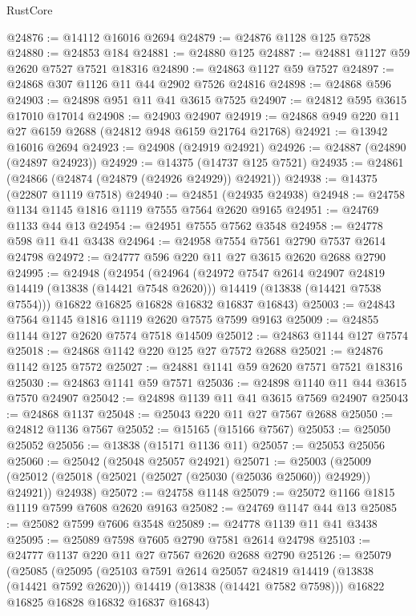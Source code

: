 \begin{lexlean}{RustCore}
\begin{coremodule}
@24876 := @14112 @16016 @2694
@24879 := @24876 @1128 @125 @7528
@24880 := @24853 @184
@24881 := @24880 @125
@24887 := @24881 @1127 @59 @2620 @7527 @7521 @18316
@24890 := @24863 @1127 @59 @7527
@24897 := @24868 @307 @1126 @11 @44 @2902 @7526 @24816
@24898 := @24868 @596
@24903 := @24898 @951 @11 @41 @3615 @7525
@24907 := @24812 @595 @3615 @17010 @17014
@24908 := @24903 @24907
@24919 := @24868 @949 @220 @11 @27 @6159 @2688 (@24812 @948 @6159 @21764 @21768)
@24921 := @13942 @16016 @2694
@24923 := @24908 (@24919 @24921)
@24926 := @24887 (@24890 (@24897 @24923))
@24929 := @14375 (@14737 @125 @7521)
@24935 := @24861 (@24866 (@24874 (@24879 (@24926 @24929)) @24921))
@24938 := @14375 (@22807 @1119 @7518)
@24940 := @24851 (@24935 @24938)
@24948 := @24758 @1134 @1145 @1816 @1119 @7555 @7564 @2620 @9165
@24951 := @24769 @1133 @44 @13
@24954 := @24951 @7555 @7562 @3548
@24958 := @24778 @598 @11 @41 @3438
@24964 := @24958 @7554 @7561 @2790 @7537 @2614 @24798
@24972 := @24777 @596 @220 @11 @27 @3615 @2620 @2688 @2790
@24995 := @24948
    (@24954
      (@24964
        (@24972 @7547 @2614 @24907 @24819 @14419 (@13838 (@14421 @7548 @2620)))
        @14419
        (@13838 (@14421 @7538 @7554)))
      @16822
      @16825
      @16828
      @16832
      @16837
      @16843)
@25003 := @24843 @7564 @1145 @1816 @1119 @2620 @7575 @7599 @9163
@25009 := @24855 @1144 @127 @2620 @7574 @7518 @14509
@25012 := @24863 @1144 @127 @7574
@25018 := @24868 @1142 @220 @125 @27 @7572 @2688
@25021 := @24876 @1142 @125 @7572
@25027 := @24881 @1141 @59 @2620 @7571 @7521 @18316
@25030 := @24863 @1141 @59 @7571
@25036 := @24898 @1140 @11 @44 @3615 @7570 @24907
@25042 := @24898 @1139 @11 @41 @3615 @7569 @24907
@25043 := @24868 @1137
@25048 := @25043 @220 @11 @27 @7567 @2688
@25050 := @24812 @1136 @7567
@25052 := @15165 (@15166 @7567)
@25053 := @25050 @25052
@25056 := @13838 (@15171 @1136 @11)
@25057 := @25053 @25056
@25060 := @25042 (@25048 @25057 @24921)
@25071 := @25003
    (@25009 (@25012 (@25018 (@25021 (@25027 (@25030 (@25036 @25060)) @24929)) @24921)) @24938)
@25072 := @24758 @1148
@25079 := @25072 @1166 @1815 @1119 @7599 @7608 @2620 @9163
@25082 := @24769 @1147 @44 @13
@25085 := @25082 @7599 @7606 @3548
@25089 := @24778 @1139 @11 @41 @3438
@25095 := @25089 @7598 @7605 @2790 @7581 @2614 @24798
@25103 := @24777 @1137 @220 @11 @27 @7567 @2620 @2688 @2790
@25126 := @25079
    (@25085
      (@25095
        (@25103 @7591 @2614 @25057 @24819 @14419 (@13838 (@14421 @7592 @2620)))
        @14419
        (@13838 (@14421 @7582 @7598)))
      @16822
      @16825
      @16828
      @16832
      @16837
      @16843)

\end{coremodule}
\end{lexlean}
